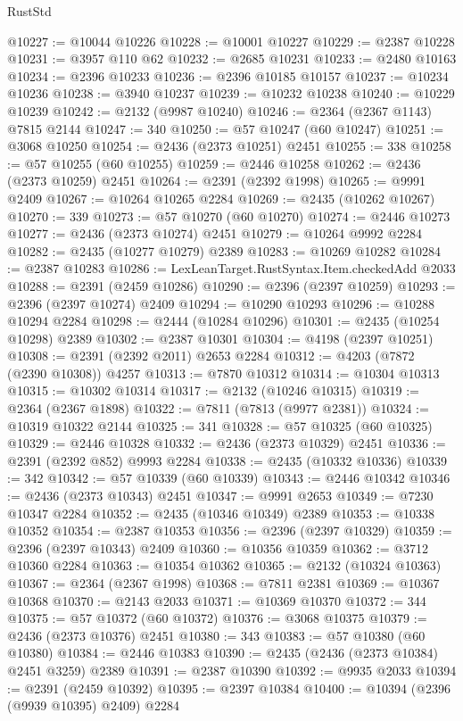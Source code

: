 \begin{lexlean}{RustStd}
\begin{coremodule}
@10227 := @10044 @10226
@10228 := @10001 @10227
@10229 := @2387 @10228
@10231 := @3957 @110 @62
@10232 := @2685 @10231
@10233 := @2480 @10163
@10234 := @2396 @10233
@10236 := @2396 @10185 @10157
@10237 := @10234 @10236
@10238 := @3940 @10237
@10239 := @10232 @10238
@10240 := @10229 @10239
@10242 := @2132 (@9987 @10240)
@10246 := @2364 (@2367 @1143) @7815 @2144
@10247 := 340
@10250 := @57 @10247 (@60 @10247)
@10251 := @3068 @10250
@10254 := @2436 (@2373 @10251) @2451
@10255 := 338
@10258 := @57 @10255 (@60 @10255)
@10259 := @2446 @10258
@10262 := @2436 (@2373 @10259) @2451
@10264 := @2391 (@2392 @1998)
@10265 := @9991 @2409
@10267 := @10264 @10265 @2284
@10269 := @2435 (@10262 @10267)
@10270 := 339
@10273 := @57 @10270 (@60 @10270)
@10274 := @2446 @10273
@10277 := @2436 (@2373 @10274) @2451
@10279 := @10264 @9992 @2284
@10282 := @2435 (@10277 @10279) @2389
@10283 := @10269 @10282
@10284 := @2387 @10283
@10286 := LexLeanTarget.RustSyntax.Item.checkedAdd @2033
@10288 := @2391 (@2459 @10286)
@10290 := @2396 (@2397 @10259)
@10293 := @2396 (@2397 @10274) @2409
@10294 := @10290 @10293
@10296 := @10288 @10294 @2284
@10298 := @2444 (@10284 @10296)
@10301 := @2435 (@10254 @10298) @2389
@10302 := @2387 @10301
@10304 := @4198 (@2397 @10251)
@10308 := @2391 (@2392 @2011) @2653 @2284
@10312 := @4203 (@7872 (@2390 @10308)) @4257
@10313 := @7870 @10312
@10314 := @10304 @10313
@10315 := @10302 @10314
@10317 := @2132 (@10246 @10315)
@10319 := @2364 (@2367 @1898)
@10322 := @7811 (@7813 (@9977 @2381))
@10324 := @10319 @10322 @2144
@10325 := 341
@10328 := @57 @10325 (@60 @10325)
@10329 := @2446 @10328
@10332 := @2436 (@2373 @10329) @2451
@10336 := @2391 (@2392 @852) @9993 @2284
@10338 := @2435 (@10332 @10336)
@10339 := 342
@10342 := @57 @10339 (@60 @10339)
@10343 := @2446 @10342
@10346 := @2436 (@2373 @10343) @2451
@10347 := @9991 @2653
@10349 := @7230 @10347 @2284
@10352 := @2435 (@10346 @10349) @2389
@10353 := @10338 @10352
@10354 := @2387 @10353
@10356 := @2396 (@2397 @10329)
@10359 := @2396 (@2397 @10343) @2409
@10360 := @10356 @10359
@10362 := @3712 @10360 @2284
@10363 := @10354 @10362
@10365 := @2132 (@10324 @10363)
@10367 := @2364 (@2367 @1998)
@10368 := @7811 @2381
@10369 := @10367 @10368
@10370 := @2143 @2033
@10371 := @10369 @10370
@10372 := 344
@10375 := @57 @10372 (@60 @10372)
@10376 := @3068 @10375
@10379 := @2436 (@2373 @10376) @2451
@10380 := 343
@10383 := @57 @10380 (@60 @10380)
@10384 := @2446 @10383
@10390 := @2435 (@2436 (@2373 @10384) @2451 @3259) @2389
@10391 := @2387 @10390
@10392 := @9935 @2033
@10394 := @2391 (@2459 @10392)
@10395 := @2397 @10384
@10400 := @10394 (@2396 (@9939 @10395) @2409) @2284

\end{coremodule}
\end{lexlean}
